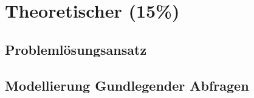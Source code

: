 \chapter{Theoretischer (15\%)}
\section{Problemlösungsansatz}
\section{Modellierung Gundlegender Abfragen}
